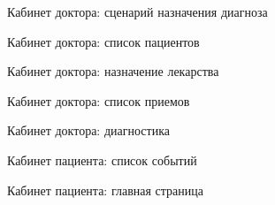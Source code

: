 \newpage
\begin{figure}[h]
\caption{Кабинет доктора: сценарий назначения диагноза}
\label{app:doctor_cabient_diagnosis_assigning}

\end{figure}

\newpage
\begin{figure}[h]
\caption{Кабинет доктора: список пациентов}
\label{app:doctor_cabinet_patients}
\end{figure}

\newpage \begin{figure}[h]
\caption{Кабинет доктора: назначение лекарства}
\label{app:doctor_cabinet_medicament}
\end{figure}

\newpage \begin{figure}[h]
\caption{Кабинет доктора: список приемов}
\label{app:doctor_cabinet_appointments}
\end{figure}

\newpage \begin{figure}[h]
\caption{Кабинет доктора: диагностика}
\label{app:doctor_cabinet_diagnostic}
\end{figure}

\newpage \begin{figure}[h]
\caption{Кабинет пациента: список событий}
\label{app:patient_cabinet_events}
\end{figure}

\newpage \begin{figure}[h]
\caption{Кабинет пациента: главная страница}
\label{app:patient_cabinet_main}
\end{figure}

